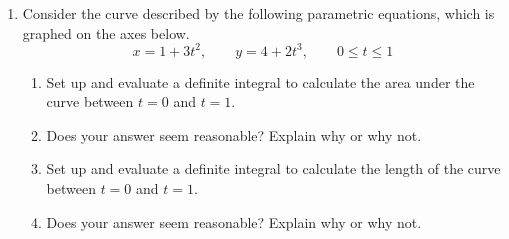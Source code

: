 \begin{enumerate}%

\item Consider the curve described by the following parametric equations, which is graphed on the axes below.
\[
x=1+3t^2, \qquad y = 4+2t^3, \qquad 0\leq t\leq 1
\]

\begin{enumerate}
\item Set up and evaluate a definite integral to calculate the area under the curve between \(t=0\) and \(t=1\).
\item Does your answer seem reasonable? Explain why or why not.
\item Set up and evaluate a definite integral to calculate the length of the curve between \(t=0\) and \(t=1\).
\item Does your answer seem reasonable? Explain why or why not.
\end{enumerate}


\end{enumerate}
